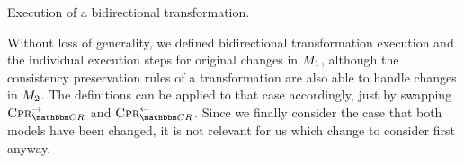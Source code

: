 
\begin{algorithm}
    
    \caption[Execution of a bidirectional transformation]{Execution of a bidirectional transformation.}
    \label{algo:synchronization:executebidirectionaltransformation}
\end{algorithm}



Without loss of generality, we defined bidirectional transformation execution and the individual execution steps for original changes in $M_{1}$, although the consistency preservation rules of a transformation are also able to handle changes in $M_{2}$.
The definitions can be applied to that case accordingly, just by swapping $\consistencypreservationrule{\consistencyrelationset{CR}}^{\rightarrow}$ and $\consistencypreservationrule{\consistencyrelationset{CR}}^{\leftarrow}$.
Since we finally consider the case that both models have been changed, it is not relevant for us which change to consider first anyway.



